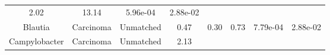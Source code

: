 \documentclass[12pt,]{article}
\begin{document}
\begin{longtable}[]{@{}cccccccc@{}}
\begin{minipage}[t]{0.13\columnwidth}
2.02\strut
\end{minipage} & \begin{minipage}[t]{0.13\columnwidth}\centering\strut
13.14\strut
\end{minipage} & \begin{minipage}[t]{0.07\columnwidth}\centering\strut
5.96e-04\strut
\end{minipage} & \begin{minipage}[t]{0.07\columnwidth}\centering\strut
2.88e-02\strut
\end{minipage}\tabularnewline
\begin{minipage}[t]{0.16\columnwidth}\centering\strut
Blautia\strut
\end{minipage} & \begin{minipage}[t]{0.08\columnwidth}\centering\strut
Carcinoma\strut
\end{minipage} & \begin{minipage}[t]{0.09\columnwidth}\centering\strut
Unmatched\strut
\end{minipage} & \begin{minipage}[t]{0.05\columnwidth}\centering\strut
0.47\strut
\end{minipage} & \begin{minipage}[t]{0.13\columnwidth}\centering\strut
0.30\strut
\end{minipage} & \begin{minipage}[t]{0.13\columnwidth}\centering\strut
0.73\strut
\end{minipage} & \begin{minipage}[t]{0.07\columnwidth}\centering\strut
7.79e-04\strut
\end{minipage} & \begin{minipage}[t]{0.07\columnwidth}\centering\strut
2.88e-02\strut
\end{minipage}\tabularnewline
\begin{minipage}[t]{0.16\columnwidth}\centering\strut
Campylobacter\strut
\end{minipage} & \begin{minipage}[t]{0.08\columnwidth}\centering\strut
Carcinoma\strut
\end{minipage} & \begin{minipage}[t]{0.09\columnwidth}\centering\strut
Unmatched\strut
\end{minipage} & \begin{minipage}[t]{0.05\columnwidth}\centering\strut
2.13\strut
\end{minipage} & \begin{minipage}[t]{0.13\columnwidth}\centering\strut

\end{minipage}
\end{longtable}
\end{document}
